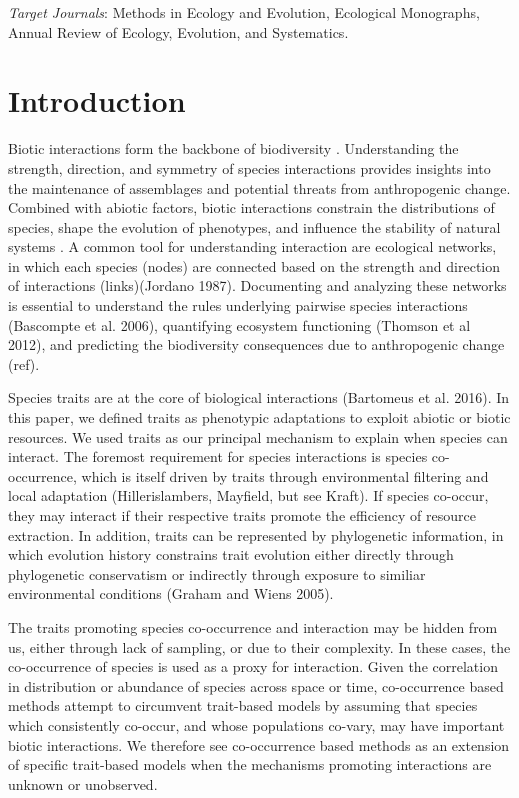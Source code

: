 \emph{Target Journals}: Methods in Ecology and Evolution, Ecological Monographs,
Annual Review of Ecology, Evolution, and Systematics.

\section{Introduction}\label{introduction}

Biotic interactions form the backbone of biodiversity
\cite{bascompte_plant-animal_2007}. Understanding the strength, direction, and
symmetry of species interactions provides insights into the maintenance of
assemblages and potential threats from anthropogenic change. Combined with
abiotic factors, biotic interactions constrain the distributions of species,
shape the evolution of phenotypes, and influence the stability of natural
systems \cite{schleuning_predicting_2015}. A common tool for understanding
interaction are ecological networks, in which each species (nodes) are connected
based on the strength and direction of interactions (links)(Jordano 1987).
Documenting and analyzing these networks is essential to understand the rules
underlying pairwise species interactions (Bascompte et al. 2006), quantifying
ecosystem functioning (Thomson et al 2012), and predicting the biodiversity
consequences due to anthropogenic change (ref).

Species traits are at the core of biological interactions (Bartomeus et al.
2016). In this paper, we defined traits as phenotypic adaptations to exploit abiotic or
biotic resources. We used traits as our principal mechanism to explain when
species can interact. The foremost requirement for species interactions is
species co-occurrence, which is itself driven by traits through environmental
filtering and local adaptation (Hillerislambers, Mayfield, but see Kraft). If
species co-occur, they may interact if their respective traits promote the
efficiency of resource extraction. In addition, traits can be represented by
phylogenetic information, in which evolution history constrains trait evolution
either directly through phylogenetic conservatism or indirectly through exposure
to similiar environmental conditions (Graham and Wiens 2005).

The traits promoting species co-occurrence and interaction may be hidden from
us, either through lack of sampling, or due to their complexity. In these cases,
the co-occurrence of species is used as a proxy for interaction. Given the
correlation in distribution or abundance of species across space or time,
co-occurrence based methods attempt to circumvent trait-based models by assuming
that species which consistently co-occur, and whose populations co-vary, may
have important biotic interactions. We therefore see co-occurrence based methods
as an extension of specific trait-based models when the mechanisms promoting
interactions are unknown or unobserved.

